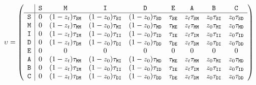 \begin{equation}
\upsilon =
\left(
    \begin{array}{r|cccccccc}
    & {\tt S} & {\tt M} & {\tt I} & {\tt D} & {\tt E} & {\tt A} & {\tt B} & {\tt C} \\
    \hline
    {\tt S} & 0 & (1 - z_t)\tau_{{\tt S}{\tt M}} & (1 - z_0) \tau_{{\tt S}{\tt I}} & (1 - z_0) \tau_{{\tt S}{\tt D}} & \tau_{{\tt S}{\tt E}} & z_t \tau_{{\tt S}{\tt M}} & z_0 \tau_{{\tt S}{\tt I}} & z_0 \tau_{{\tt S}{\tt D}} \\
    {\tt M} & 0 & (1 - z_t)\tau_{{\tt M}{\tt M}} & (1 - z_0) \tau_{{\tt M}{\tt I}} & (1 - z_0) \tau_{{\tt M}{\tt D}} & \tau_{{\tt M}{\tt E}} & z_t \tau_{{\tt M}{\tt M}} & z_0 \tau_{{\tt M}{\tt I}} & z_0 \tau_{{\tt M}{\tt D}} \\
    {\tt I} & 0 & (1 - z_t)\tau_{{\tt I}{\tt M}} & (1 - z_0) \tau_{{\tt I}{\tt I}} & (1 - z_0) \tau_{{\tt I}{\tt D}} & \tau_{{\tt I}{\tt E}} & z_t \tau_{{\tt I}{\tt M}} & z_0 \tau_{{\tt I}{\tt I}} & z_0 \tau_{{\tt I}{\tt D}} \\
    {\tt D} & 0 & (1 - z_t)\tau_{{\tt D}{\tt M}} & (1 - z_0) \tau_{{\tt D}{\tt I}} & (1 - z_0) \tau_{{\tt D}{\tt D}} & \tau_{{\tt D}{\tt E}} & z_t \tau_{{\tt D}{\tt M}} & z_0 \tau_{{\tt D}{\tt I}} & z_0 \tau_{{\tt D}{\tt D}} \\
    {\tt E} & 0 & 0 & 0 & 0 & 0 & 0 & 0 & 0 \\
    {\tt A} & 0 & (1 - z_t)\tau_{{\tt M}{\tt M}} & (1 - z_0) \tau_{{\tt M}{\tt I}} & (1 - z_0) \tau_{{\tt M}{\tt D}} & \tau_{{\tt M}{\tt E}} & z_t \tau_{{\tt M}{\tt M}} & z_0 \tau_{{\tt M}{\tt I}} & z_0 \tau_{{\tt M}{\tt D}} \\
    {\tt B} & 0 & (1 - z_t)\tau_{{\tt I}{\tt M}} & (1 - z_0) \tau_{{\tt I}{\tt I}} & (1 - z_0) \tau_{{\tt I}{\tt D}} & \tau_{{\tt I}{\tt E}} & z_t \tau_{{\tt I}{\tt M}} & z_0 \tau_{{\tt I}{\tt I}} & z_0 \tau_{{\tt I}{\tt D}} \\
    {\tt C} & 0 & (1 - z_t)\tau_{{\tt D}{\tt M}} & (1 - z_0) \tau_{{\tt D}{\tt I}} & (1 - z_0) \tau_{{\tt D}{\tt D}} & \tau_{{\tt D}{\tt E}} & z_t \tau_{{\tt D}{\tt M}} & z_0 \tau_{{\tt D}{\tt I}} & z_0 \tau_{{\tt D}{\tt D}} \\
    \end{array}
\right)
\label{eq:exptrans_matrix}
  \end{equation}
